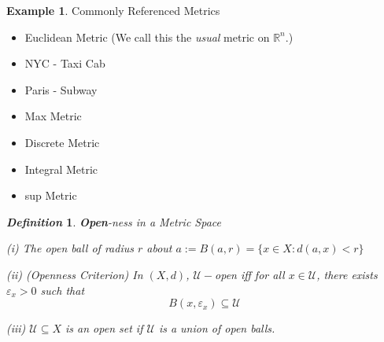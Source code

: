 \documentclass[12pt, letterpaper]{report}
\newcounter{theo}\setcounter{theo}{0}
\newcommand{\vs}{\vspace}
\def\U{\mathscr{U}}
\newcommand{\ms}[2]{({#1},{#2})}
\newcommand{\e}{\varepsilon}
\newcommand{\0}{\emptyset}
\def\R{\mathbb{R}}
\theoremstyle{theorem}
\newtheorem{defn}{\emph{Definition}}
\theoremstyle{definition}
\theoremstyle{definition}
\newtheorem{ex}{Example}
\theoremstyle{definition}
\theoremstyle{definition}
\theoremstyle{theorem}
\theoremstyle{theorem}
\theoremstyle{remark}
\begin{document}
\vs{4mm}
	
	\begin{ex}{Commonly Referenced Metrics}
			\begin{itemize}
				\item Euclidean Metric (We call this the \emph{usual} metric on $\R^n$.)
				\item NYC - Taxi Cab
				\item Paris - Subway 
				\item Max Metric
				\item Discrete Metric
				\item Integral Metric
				\item sup Metric
			\end{itemize}
	\end{ex}
	
\vs{4mm}
	
\begin{defn}{\textbf{Open}-ness in a Metric Space}
	

(i) The open ball of radius $r$ about $a := B(a,r) = \{x \in X : d(a,x)<r\}$

(ii) (Openness Criterion)
In $\ms{X}{d}$, $\U-$open iff for all $x\in \U$, there exists $\e_x>0$ such that $$B(x,\e_x) \subseteq \U$$

(iii) $\U\subseteq X$ is an open set if $\U$ is a union of open balls.
	
\end{defn}
\end{document}
